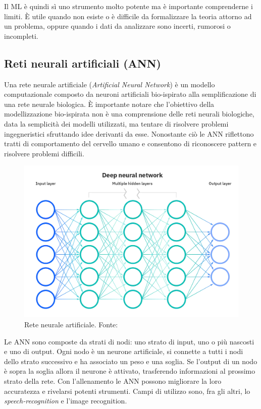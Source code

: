 Il ML è quindi sì uno strumento molto potente ma è importante comprenderne i limiti. È utile quando non esiste o è difficile da formalizzare la teoria attorno ad un problema, oppure quando i dati da analizzare sono incerti, rumorosi o incompleti.

\subsection{Reti neurali artificiali (ANN)}

Una rete neurale artificiale (\textit{Artificial Neural Network}) è un modello computazionale composto da neuroni artificiali bio-ispirato alla semplificazione di una rete neurale biologica. È importante notare che l'obiettivo della modellizzazione bio-ispirata non è una comprensione delle reti neurali biologiche, data la semplicità dei modelli utilizzati, ma tentare di risolvere problemi ingegneristici sfruttando idee derivanti da esse. Nonostante ciò le ANN riflettono tratti di comportamento del cervello umano e consentono di riconoscere pattern e risolvere problemi difficili.

\begin{figure}[!h]
	\centering
	\includegraphics[scale=0.2]{images/ann.png}
	\caption{Rete neurale artificiale. Fonte: \cite{neuralNetworksIBM}}
	\label{fig:rete-neurale}
\end{figure}

\par Le ANN sono composte da strati di nodi: uno strato di input, uno o più nascosti e uno di output. Ogni nodo è un neurone artificiale, si connette a tutti i nodi dello strato successivo e ha associato un peso e una soglia. Se l'output di un nodo è sopra la soglia allora il neurone è attivato, trasferendo informazioni al prossimo strato della rete. Con l'allenamento le ANN possono migliorare la loro accuratezza e rivelarsi potenti strumenti. Campi di utilizzo sono, fra gli altri, lo \textit{speech-recognition} e l'{image recognition}.

